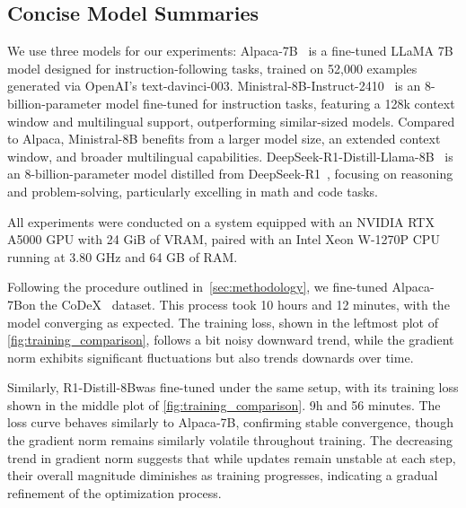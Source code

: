 \documentclass[12pt,a4paper]{article}
\newcommand{\modelalpaca}{Alpaca-7B}
\newcommand{\modeldeepseek}{R1-Distill-8B}
\begin{document}

\subsection{Concise Model Summaries}

We use three models for our experiments:
Alpaca-7B~\cite{taori2023stanford} is a fine-tuned LLaMA 7B model designed for instruction-following tasks, trained on 52,000 examples generated via OpenAI’s text-davinci-003.
Ministral-8B-Instruct-2410~\cite{mistralai2024ministral8b} is an 8-billion-parameter model fine-tuned for instruction tasks, featuring a 128k context window and multilingual support, outperforming similar-sized models.
Compared to Alpaca, Ministral-8B benefits from a larger model size, an extended context window, and broader multilingual capabilities.
DeepSeek-R1-Distill-Llama-8B~\cite{deepseekai2025deepseekr1distillllama8b} is an 8-billion-parameter model distilled from DeepSeek-R1~\cite{guo2025deepseek}, focusing on reasoning and problem-solving, particularly excelling in math and code tasks.

All experiments were conducted on a system equipped with an NVIDIA RTX A5000 GPU with 24 GiB of VRAM, paired with an Intel Xeon W-1270P CPU running at 3.80 GHz and 64 GB of RAM.




Following the procedure outlined in~\cref{sec:methodology}, we fine-tuned \modelalpaca on the CoDeX~\cite{safavi2020codex} dataset.
This process took 10 hours and 12 minutes, with the model converging as expected.
The training loss, shown in the leftmost plot of \cref{fig:training_comparison}, follows a bit noisy downward trend, while the gradient norm exhibits significant fluctuations but also trends downards over time.

Similarly, \modeldeepseek was fine-tuned under the same setup, with its training loss shown in the middle plot of \cref{fig:training_comparison}.
9h and 56 minutes.
The loss curve behaves similarly to \modelalpaca, confirming stable convergence, though the gradient norm remains similarly volatile throughout training.
The decreasing trend in gradient norm suggests that while updates remain unstable at each step, their overall magnitude diminishes as training progresses, indicating a gradual refinement of the optimization process.
\end{document}
